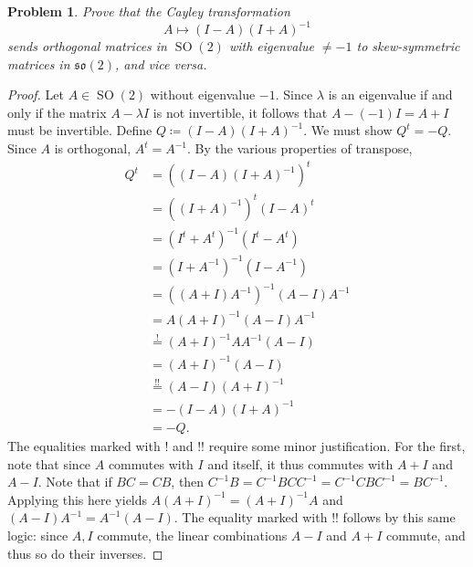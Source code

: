 \documentclass[11pt, letterpaper]{article}
\theoremstyle{plain}
\newtheorem{problem}{Problem}
\begin{document}
\begin{problem}
	Prove that the Cayley transformation
	\[
		A\mapsto (I-A)(I+A)^{-1} 
	\]
	sends orthogonal matrices in $\operatorname{SO} (2)$ with eigenvalue $\neq -1$ to skew-symmetric matrices in $\mathfrak{so} (2)$, and vice versa.

\end{problem}
\begin{proof}
	Let $A\in \operatorname{SO} (2)$ without eigenvalue $-1$. Since $\lambda $ is an eigenvalue if and only if the matrix $A-\lambda I$ is not invertible, it follows that $A-(-1)I=A+I$ must be invertible. Define $Q\coloneqq (I-A)(I+A)^{-1} $. We must show $Q^t=-Q$. Since $A$ is orthogonal, $A^t=A^{-1} $. By the various properties of transpose,
	\begin{align*}
		Q^t&=\left( (I-A)(I+A)^{-1}  \right) ^t\\
		   &=\left( \left( I+A \right) ^{-1}  \right) ^t\left( I-A \right) ^t\\
		   &=\left( I^t+A^t \right) ^{-1} \left( I^t-A^t \right) \\
		   &=\left( I+A^{-1}  \right) ^{-1} \left( I-A^{-1}  \right)\\
		   &=\left( \left( A+I \right) A^{-1}  \right) ^{-1} \left( A-I  \right)A^{-1}\\
		   &=A(A+I)^{-1} (A-I)A^{-1} \\
		   &\overset{!}{=}(A+I)^{-1} A A^{-1} (A-I)\\
		   &=(A+I)^{-1} (A-I)\\
		   &\overset{!!}{=}(A-I)(A+I)^{-1} \\
		   &=-(I-A)(I+A)^{-1} \\
		   &=-Q
	.\end{align*}
	The equalities marked with $!$ and $!!$ require some minor justification. For the first, note that since $A$ commutes with $I$ and itself, it thus commutes with $A+I$ and $A-I$. Note that if $BC=CB$, then $C^{-1} B=C^{-1} BCC^{-1} =C^{-1} CBC^{-1} =BC^{-1} $. Applying this here yields $A(A+I)^{-1} =(A+I)^{-1} A$ and $(A-I)A^{-1} =A^{-1} (A-I)$. The equality marked with $!!$ follows by this same logic: since $A,I$ commute, the linear combinations $A-I$ and $A+I$ commute, and thus so do their inverses.


\end{proof}
\end{document}
